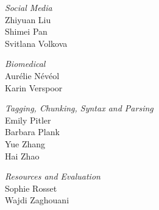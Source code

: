 \emph{Social Media} \\
\hspace*{0.2in} Zhiyuan Liu \\
\hspace*{0.2in} Shimei Pan \\
\hspace*{0.2in} Svitlana Volkova

\emph{Biomedical} \\
\hspace*{0.2in} Aurélie Névéol \\
\hspace*{0.2in} Karin Verspoor

\emph{Tagging, Chunking, Syntax and Parsing} \\
\hspace*{0.2in} Emily Pitler \\
\hspace*{0.2in} Barbara Plank \\
\hspace*{0.2in} Yue Zhang \\
\hspace*{0.2in} Hai Zhao

\emph{Resources and Evaluation} \\
\hspace*{0.2in} Sophie Rosset \\
\hspace*{0.2in} Wajdi Zaghouani
